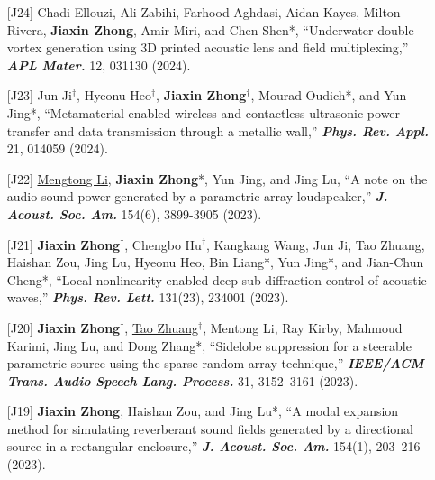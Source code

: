 \documentclass[10pt,a4paper,ragged2e,withhyper]{altacv}
\newcommand{\PubJournal}[1]{\textbf{\textit{#1}}}
\newcommand{\PubTitle}[1]{``{#1,}''}
\newcommand{\PubCorAuthor}[1]{#1*}
\newcommand{\PubMe}[1]{\textbf{#1}}
\begin{document}
\begin{itemize}[leftmargin = 30pt]
    \item[{[J24]}]
    Chadi Ellouzi, Ali Zabihi, Farhood Aghdasi, Aidan Kayes, Milton Rivera, \PubMe{Jiaxin Zhong}, Amir Miri, and \PubCorAuthor{Chen Shen},
    \PubTitle{Underwater double vortex generation using 3D printed acoustic lens and field multiplexing}
    \PubJournal{APL Mater.} 12, 031130 (2024).
    \href{https://doi.org/10.1063/5.0201781}{\color{accent}\aiDoi}

    \item[{[J23]}]
    Jun Ji$^\dag$, Hyeonu Heo$^\dag$, \PubMe{Jiaxin Zhong}$^\dag$, \PubCorAuthor{Mourad Oudich}, and \PubCorAuthor{Yun Jing},
    \PubTitle{Metamaterial-enabled wireless and contactless ultrasonic power transfer and data transmission through a metallic wall}
    \PubJournal{Phys. Rev. Appl.} 21, 014059 (2024).
    \href{https://doi.org/10.1103/PhysRevApplied.21.014059}{\color{accent}\aiDoi}

    \item[{[J22]}]
    \underline{Mengtong Li}, \PubCorAuthor{\PubMe{Jiaxin Zhong}}, Yun Jing, and Jing Lu,
    \PubTitle{A note on the audio sound power generated by a parametric array loudspeaker}
    \PubJournal{J. Acoust. Soc. Am.} 154(6), 3899-3905 (2023).
    \href{https://doi.org/10.1121/10.0023955}{\color{accent}\aiDoi}

    \item[{[J21]}]
    \PubMe{Jiaxin Zhong}$^\dag$, Chengbo Hu$^\dag$, Kangkang Wang, Jun Ji, Tao Zhuang, Haishan Zou, Jing Lu, Hyeonu Heo, \PubCorAuthor{Bin Liang}, \PubCorAuthor{Yun Jing}, and \PubCorAuthor{Jian-Chun Cheng},
    \PubTitle{Local-nonlinearity-enabled deep sub-diffraction control of acoustic waves}
    \PubJournal{Phys. Rev. Lett.} 131(23), 234001 (2023).
    \href{https://doi.org/10.1103/PhysRevLett.131.234001}{\color{accent}\aiDoi}

    \item[{[J20]}]
    \PubMe{Jiaxin Zhong}$^\dag$, \underline{Tao Zhuang}$^\dag$, Mentong Li, Ray Kirby, Mahmoud Karimi, Jing Lu, and \PubCorAuthor{Dong Zhang},
    \PubTitle{Sidelobe suppression for a steerable parametric source using the sparse random array technique}
    \PubJournal{IEEE/ACM Trans. Audio Speech Lang. Process.}
    31, 3152--3161 (2023).
    \href{10.1109/TASLP.2023.3304491}{\color{accent}\aiDoi}

    \item[{[J19]}]
    \PubMe{Jiaxin Zhong}, Haishan Zou, and \PubCorAuthor{Jing Lu},
    \PubTitle{A modal expansion method for simulating reverberant sound fields generated by a directional source in a rectangular enclosure}
    \PubJournal{J. Acoust. Soc. Am.}
    154(1), 203--216 (2023).
    \href{https://doi.org/10.1121/10.0020070}{\color{accent}\aiDoi}
    \href{https://github.com/JiaxinZhong/JiaxinZhong.github.io/raw/master/publications/journal/Zhong2023-JASA-EnclosureDirectionalSource.pdf}{\color{accent}\faFilePdf[regular]}


\end{itemize}
\end{document}
